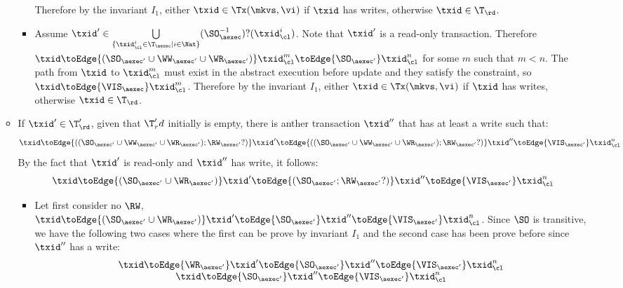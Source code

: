 \begin{itemize}
\begin{itemize}
\begin{itemize}
            Therefore by the invariant \( I_1 \), either \( \txid \in \Tx(\mkvs, \vi) \) if \( \txid \) has writes, otherwise \(\txid \in \T_\rd \).
        \item Assume \( \txid' \in \bigcup\limits_{\{\txid_{\cl}^{i} \in \T_{\aexec} \mid i \in \Nat\}} (\SO_{\aexec}^{-1})?(\txid^i_\cl) \).
            Note that  \( \txid' \) is a read-only transaction.
            Therefore \( \txid \toEdge{\left( \SO_{\aexec'} \cup \WW_{\aexec'} \cup \WR_{\aexec'}  \right)} \txid_\cl^m \toEdge{\SO_{\aexec'}}  \txid_\cl^n \) for some \( m \) such that \( m < n \).
            The path from \( \txid \) to \( \txid_\cl^m \) must exist in the abstract execution before update and they satisfy the constraint, so \( \txid \toEdge{\VIS_\aexec} \txid_\cl^m \).
            Therefore by the invariant \( I_1 \), either \( \txid \in \Tx(\mkvs, \vi) \) if \( \txid \) has writes, otherwise \(\txid \in \T_\rd \).
        \end{itemize}
    \item If \( \txid' \in \T'_\rd \), given that \( \T'_rd \) initially is empty, there is anther transaction \( \txid'' \) that has at least a write such that:
        \[
            \txid \toEdge{\left( (\SO_{\aexec'} \cup \WW_{\aexec'} \cup \WR_{\aexec'} ) ; \RW_{\aexec'}? \right) } \txid' \toEdge{\left( (\SO_{\aexec'} \cup \WW_{\aexec'} \cup \WR_{\aexec'} ) ; \RW_{\aexec'}? \right) } \txid'' \toEdge{\VIS_{\aexec'}}  \txid_\cl^n 
        \]
        By the fact that \( \txid' \) is read-only and \( \txid'' \) has write, it follows:
        \[
            \txid \toEdge{\left( \SO_{\aexec'} \cup \WR_{\aexec'} \right) } \txid' \toEdge{\left( \SO_{\aexec'} ; \RW_{\aexec'}? \right) } \txid'' \toEdge{\VIS_{\aexec'}}  \txid_\cl^n 
        \]
        \begin{itemize}
            \item 
            Let first consider no \( \RW \), \ie  \( \txid \toEdge{\left( \SO_{\aexec'} \cup \WR_{\aexec'} \right) } \txid' \toEdge{\SO_{\aexec'} } \txid'' \toEdge{\VIS_{\aexec'}}  \txid_\cl^n  \).
            Since \( \SO \) is transitive, we have the following two cases where the first can be prove by invariant \( I_1 \) and the second case has been prove before since \( \txid'' \) has a write:
            \[
                \begin{array}{@{}c@{}}
                    \txid \toEdge{\WR_{\aexec'} } \txid' \toEdge{\SO_{\aexec'} } \txid'' \toEdge{\VIS_{\aexec'}}  \txid_\cl^n  \\
                    \txid \toEdge{\SO_{\aexec'} } \txid'' \toEdge{\VIS_{\aexec'}}  \txid_\cl^n 

\end{array}\]
\end{itemize}
\end{itemize}
\end{itemize}
